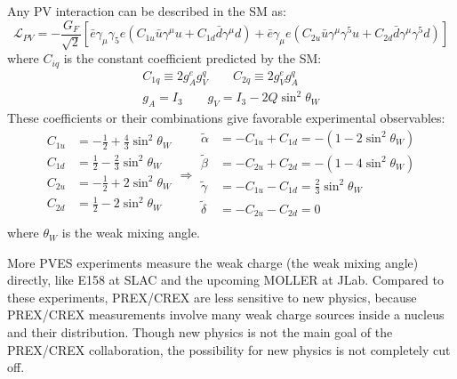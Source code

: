 Any PV interaction can be described in the SM as:
\begin{equation}
    \mathcal{L}_{PV}  = -\frac{G_F}{\sqrt{2}}\left[ 
	\bar{e}\gamma_\mu\gamma_5 e (C_{1u}\bar{u}\gamma^\mu u + C_{1d}\bar{d}\gamma^\mu d)
      + \bar{e}\gamma_\mu e (C_{2u}\bar{u}\gamma^\mu\gamma^5 u + C_{2d}\bar{d}\gamma^\mu \gamma^5d)
	\right]
\end{equation}
where $C_{iq}$ is the constant coefficient predicted by the SM:
\begin{equation}
    \begin{gathered}
	C_{1q} \equiv 2g_A^e g_V^q	\qquad C_{2q} \equiv 2g_V^e g_A^q   \\
	g_A = I_3   \qquad g_V = I_3 - 2Q\sin^2\theta_W
    \end{gathered}
\end{equation}
These coefficients or their combinations give favorable experimental observables:
\begin{equation}
    \begin{aligned}
	C_{1u} &= -\frac{1}{2} + \frac{4}{3}\sin^2\theta_W   \\
	C_{1d} &= \frac{1}{2} - \frac{2}{3}\sin^2\theta_W   \\
	C_{2u} &= -\frac{1}{2} + 2\sin^2\theta_W   \\
	C_{2d} &= \frac{1}{2} - 2\sin^2\theta_W   \\
    \end{aligned}
    \Longrightarrow
    \begin{aligned}
	\tilde{\alpha} &= -C_{1u} + C_{1d} = -(1-2\sin^2\theta_W)	\\
	\tilde{\beta} &= -C_{2u} + C_{2d} = -(1-4\sin^2\theta_W)	\\
	\tilde{\gamma} &= -C_{1u} - C_{1d} = \frac{2}{3}\sin^2\theta_W	\\
	\tilde{\delta} &= -C_{2u} - C_{2d} = 0	\\
    \end{aligned}
\end{equation}
where $\theta_W$ is the weak mixing angle.

More PVES experiments measure the weak charge (the weak mixing angle) directly, like
E158 at SLAC and the upcoming MOLLER at JLab. Compared to these experiments, PREX/CREX
are less sensitive to new physics, because PREX/CREX measurements involve many 
weak charge sources inside a nucleus and their distribution. Though new physics
is not the main goal of the PREX/CREX collaboration, the possibility for new physics 
is not completely cut off.

